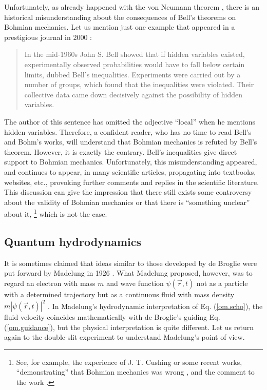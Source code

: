 \documentclass[onecolumn,nofootinbib, secnumarabic, amsmath, nobibnotes,12pt,aps,pra]{revtex4-1}
\newcommand{\eref}[1]{Eq. (\ref{#1})}
\newcommand{\abs}[1]{\left| #1 \right|} %
\begin{document}
Unfortunately, as already happened with the von Neumann theorem \cite{om.impossibility_proofs}, there is an historical misunderstanding about the consequences of Bell's theorems on Bohmian mechanics. Let us mention just one example that appeared in a prestigious journal in 2000 \cite{om.100years}:\vspace*{-6pt}\\
\begin{quote}
In the mid-1960s John S. Bell showed that if hidden variables existed, experimentally observed probabilities would have to fall below certain limits, dubbed Bell's inequalities. Experiments were carried out by a number of groups, which found that the inequalities were violated. Their collective data came down decisively against the possibility of hidden variables.\vspace*{-6pt}\\
\end{quote}
The author of this sentence has omitted the adjective ``local'' when
he mentions hidden variables. Therefore, a confident reader, who has
no time to read Bell's and Bohm's works, will understand that
Bohmian mechanics is refuted by Bell's theorem. However, it is
exactly the contrary. Bell's inequalities give direct support to
Bohmian mechanics. Unfortunately, this misunderstanding appeared,
and continues to appear, in many scientific articles, propagating
into textbooks, websites, etc., provoking further comments and
replies in the scientific literature. This discussion can give the
impression that there still exists some controversy about the
validity of Bohmian mechanics or that there is ``something unclear''
about  it,%
\footnote{See, for example, the experience
of J. T. Cushing \cite{om.erors2} or some recent works,
``demonstrating'' that Bohmian mechanics was wrong
\cite{om.bifoton2}, and the comment to the work
\cite{om.bifoton1}.} which is not the case.\enlargethispage{-1pc}

\subsection{Quantum hydrodynamics}\label{om.sec_intro.9}

It is sometimes claimed that ideas similar to those developed by de Broglie were put forward by Madelung in 1926 \cite{om.Madelung}. What Madelung proposed, however, was to regard an electron with mass $m$ and wave function $\psi(\vec{r},t)$ not as a particle with a determined trajectory but as a continuous fluid with mass density $m \abs{\psi(\vec{r},t)}^2$ \cite{om.wyatt2005,om.Takabayasi}. In Madelung's hydrodynamic interpretation of \eref{om.scho}, the fluid velocity coincides mathematically with de Broglie's guiding \eref{om.guidance}, but the physical interpretation is quite different.
Let us return again to the double-slit experiment to understand Madelung's point of view.
\end{document}
